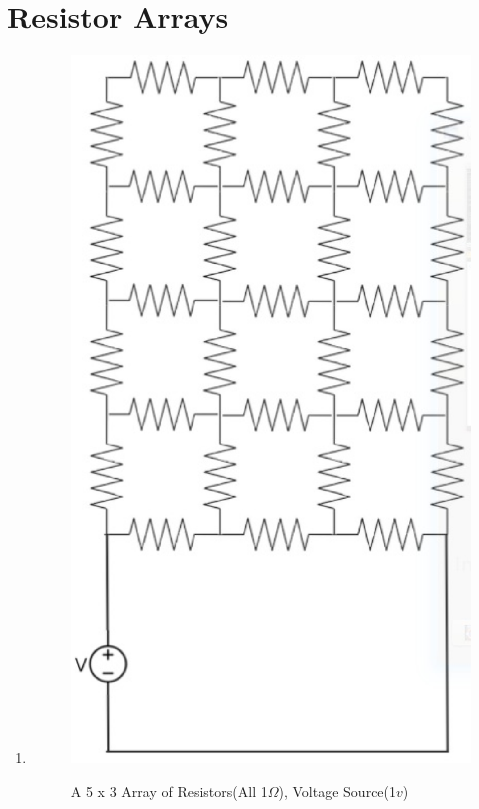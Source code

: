 \documentclass{report}
\begin{document}
\section{Resistor Arrays}
\begin{enumerate}
\item 
\begin{figure}[H]
\centering \caption{A 5 x 3 Array of Resistors(All 1$\Omega$), Voltage Source(1$v$)}
\includegraphics[scale=.42]{array.eps}
\label{sej}
\end{figure}

\end{enumerate}
\end{document}
